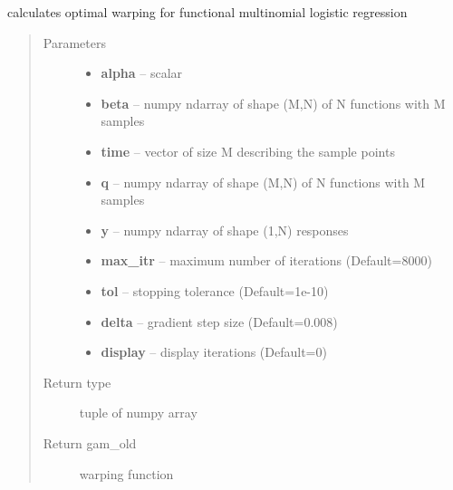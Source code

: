 \documentclass[letterpaper,10pt,english]{sphinxmanual}
\begin{document}
\begin{fulllineitems}
\label{regression:regression.mlogit_warp_grad}
calculates optimal warping for functional multinomial logistic regression
\begin{quote}\begin{description}
\item[{Parameters}] \leavevmode\begin{itemize}
\item {} 
\textbf{alpha} -- scalar

\item {} 
\textbf{beta} -- numpy ndarray of shape (M,N) of N functions with M samples

\item {} 
\textbf{time} -- vector of size M describing the sample points

\item {} 
\textbf{q} -- numpy ndarray of shape (M,N) of N functions with M samples

\item {} 
\textbf{y} -- numpy ndarray of shape (1,N) responses

\item {} 
\textbf{max\_itr} -- maximum number of iterations (Default=8000)

\item {} 
\textbf{tol} -- stopping tolerance (Default=1e-10)

\item {} 
\textbf{delta} -- gradient step size (Default=0.008)

\item {} 
\textbf{display} -- display iterations (Default=0)

\end{itemize}

\item[{Return type}] \leavevmode
tuple of numpy array

\item[{Return gam\_old}] \leavevmode
warping function

\end{description}\end{quote}

\end{fulllineitems}

\end{document}

